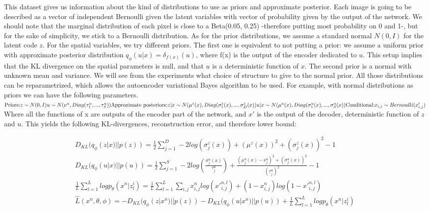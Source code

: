 \documentclass[letterpaper, twoside]{article}
\begin{document}
This dataset gives us information about the kind of distributions to use as priors and approximate posterior. Each image is going to be described as a vector of independent Bernoulli given the latent variables with vector of probability given by the output of the network. We should note that the marginal distribution of each pixel is close to a Beta(0.05, 0.25) -therefore putting most probability on 0 and 1-, but for the sake of simplicity, we stick to a Bernoulli distribution. As for the prior distributions, we assume a standard normal $N(0, I)$ for the latent code $z$. For the spatial variables, we try different priors. The first one is equivalent to not putting a prior: we assume a uniform prior with approximate posterior distribution $q_\phi(u|x) = \delta_{f(x)}(u)$, where f(x) is the output of the encoder dedicated to $u$. This setup implies that the KL divergence on the spatial parameters is null, and that $u$ is a deterministic function of $x$. The second prior is a normal with unknown mean and variance. We will see from the experiments what choice of structure to give to the normal prior. All those distributions can be reparametrized, which allows the autoencoder variational Bayes algorithm \cite{Kingma.aevb} to be used. 
For example, with normal distributions as priors we can have the following parameters.\\
$
\text{Priors:}\\
z \sim N(0, I)\\
u \sim N(\nu^u, Diag(\tau_1^u, ..., \tau_S^u))\\
\text{Approximate posteriors:}\\
 z | x \sim N(\mu^z(x), Diag(\sigma_1^z(x), ..., \sigma_D^z(x))\\
 u | x \sim N(\mu^u(x), Diag(\sigma_1^u(x), ..., \sigma_S^u(x))\\
 \text{Conditional:}\\
 x_{i, j} \sim Bernoulli(x'_{i, j})
$\\
Where all the functions of x are outputs of the encoder part of the network, and $x'$ is the output of the decoder, deterministic function of $z$ and $u$.
This yields the following KL-divergences, reconstruction error, and therefore lower bound:

\begin{align}
D_{KL}(q_\phi(z|x) || p(z)) = \frac{1}{2} \sum_{j=1}^D  -2 log (\sigma_j^z(x)) + (\mu^z(x))^2 + (\sigma_j^z(x))^2 - 1\\
D_{KL}(q_\phi(u|x) || p(u)) = \frac{1}{2} \sum_{j=1}^S -2 log (\frac{\sigma_j^u(x)}{\tau_j^u}) + \frac{(\mu_j^u(x) - \nu_j^u)^2 + (\sigma_j^u(x))^2}{(\tau_j^u)^2} - 1\\
\frac{1}{L} \sum_{l=1}^L log p_\theta(x^n | z_{l}^i) = \frac{1}{L} \sum_{l=1}^L \sum_{i, j} x_{i,j}^n log({x'}_{i, j}^{n, l}) + (1 - x_{i,j}^n) log(1 - {x'}_{i, j}^{n, l})\\
\hat L(x^n, \theta, \phi) = -D_{KL}(q_\phi(z|x^n) || p(z)) - D_{KL}(q_\phi(u|x^n) || p(u)) + \frac{1}{L} \sum_{l=1}^L log p_\theta(x^n | z_{l}^i)
\end{align}
\end{document}
